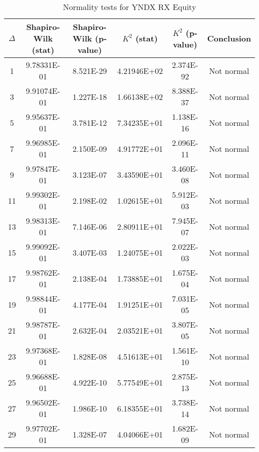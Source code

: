 \begin{table}[h]
	\begin{tabular}{|c|c|c|c|c|c|}
		\hline
		$\Delta$ &  Shapiro-Wilk (stat) & Shapiro-Wilk (p-value) & $K^2$ (stat) & $K^2$ (p-value) & Conclusion\\\hline
		\hline
		1 & 9.78331E-01 & 8.521E-29 & 4.21946E+02 & 2.374E-92 & Not normal\\\hline
		3 & 9.91074E-01 & 1.227E-18 & 1.66138E+02 & 8.388E-37 & Not normal\\\hline
		5 & 9.95637E-01 & 3.781E-12 & 7.34235E+01 & 1.138E-16 & Not normal\\\hline
		7 & 9.96985E-01 & 2.150E-09 & 4.91772E+01 & 2.096E-11 & Not normal\\\hline
		9 & 9.97847E-01 & 3.123E-07 & 3.43590E+01 & 3.460E-08 & Not normal\\\hline
		11 & 9.99302E-01 & 2.198E-02 & 1.02615E+01 & 5.912E-03 & Not normal\\\hline
		13 & 9.98313E-01 & 7.146E-06 & 2.80911E+01 & 7.945E-07 & Not normal\\\hline
		15 & 9.99092E-01 & 3.407E-03 & 1.24075E+01 & 2.022E-03 & Not normal\\\hline
		17 & 9.98762E-01 & 2.138E-04 & 1.73885E+01 & 1.675E-04 & Not normal\\\hline
		19 & 9.98844E-01 & 4.177E-04 & 1.91251E+01 & 7.031E-05 & Not normal\\\hline
		21 & 9.98787E-01 & 2.632E-04 & 2.03521E+01 & 3.807E-05 & Not normal\\\hline
		23 & 9.97368E-01 & 1.828E-08 & 4.51613E+01 & 1.561E-10 & Not normal\\\hline
		25 & 9.96688E-01 & 4.922E-10 & 5.77549E+01 & 2.875E-13 & Not normal\\\hline
		27 & 9.96502E-01 & 1.986E-10 & 6.18355E+01 & 3.738E-14 & Not normal\\\hline
		29 & 9.97702E-01 & 1.328E-07 & 4.04066E+01 & 1.682E-09 & Not normal\\\hline
	\end{tabular}
	\caption{Normality tests for YNDX RX Equity}
\end{table}
